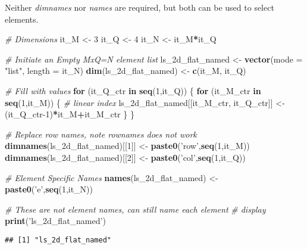 \documentclass[
]{book}
\newenvironment{Shaded}{\begin{snugshade}}{\end{snugshade}}
\newcommand{\CommentTok}[1]{\textcolor[rgb]{0.56,0.35,0.01}{\textit{#1}}}
\newcommand{\ControlFlowTok}[1]{\textcolor[rgb]{0.13,0.29,0.53}{\textbf{#1}}}
\newcommand{\DataTypeTok}[1]{\textcolor[rgb]{0.13,0.29,0.53}{#1}}
\newcommand{\DecValTok}[1]{\textcolor[rgb]{0.00,0.00,0.81}{#1}}
\newcommand{\KeywordTok}[1]{\textcolor[rgb]{0.13,0.29,0.53}{\textbf{#1}}}
\newcommand{\NormalTok}[1]{#1}
\newcommand{\OperatorTok}[1]{\textcolor[rgb]{0.81,0.36,0.00}{\textbf{#1}}}
\newcommand{\StringTok}[1]{\textcolor[rgb]{0.31,0.60,0.02}{#1}}
\begin{document}
Neither \emph{dimnames} nor \emph{names} are required, but both can be used to select elements.

\begin{Shaded}
\begin{Highlighting}[]
\CommentTok{# Dimensions}
\NormalTok{it_M <-}\StringTok{ }\DecValTok{3}
\NormalTok{it_Q <-}\StringTok{ }\DecValTok{4}
\NormalTok{it_N <-}\StringTok{ }\NormalTok{it_M}\OperatorTok{*}\NormalTok{it_Q}

\CommentTok{# Initiate an Empty MxQ=N element list}
\NormalTok{ls_2d_flat_named <-}\StringTok{ }\KeywordTok{vector}\NormalTok{(}\DataTypeTok{mode =} \StringTok{"list"}\NormalTok{, }\DataTypeTok{length =}\NormalTok{ it_N)}
\KeywordTok{dim}\NormalTok{(ls_2d_flat_named) <-}\StringTok{ }\KeywordTok{c}\NormalTok{(it_M, it_Q)}

\CommentTok{# Fill with values}
\ControlFlowTok{for}\NormalTok{ (it_Q_ctr }\ControlFlowTok{in} \KeywordTok{seq}\NormalTok{(}\DecValTok{1}\NormalTok{,it_Q)) \{}
  \ControlFlowTok{for}\NormalTok{ (it_M_ctr }\ControlFlowTok{in} \KeywordTok{seq}\NormalTok{(}\DecValTok{1}\NormalTok{,it_M)) \{}
    \CommentTok{# linear index}
\NormalTok{    ls_2d_flat_named[[it_M_ctr, it_Q_ctr]] <-}\StringTok{ }\NormalTok{(it_Q_ctr}\DecValTok{-1}\NormalTok{)}\OperatorTok{*}\NormalTok{it_M}\OperatorTok{+}\NormalTok{it_M_ctr}
\NormalTok{  \}}
\NormalTok{\}}

\CommentTok{# Replace row names, note rownames does not work}
\KeywordTok{dimnames}\NormalTok{(ls_2d_flat_named)[[}\DecValTok{1}\NormalTok{]] <-}\StringTok{ }\KeywordTok{paste0}\NormalTok{(}\StringTok{'row'}\NormalTok{,}\KeywordTok{seq}\NormalTok{(}\DecValTok{1}\NormalTok{,it_M))}
\KeywordTok{dimnames}\NormalTok{(ls_2d_flat_named)[[}\DecValTok{2}\NormalTok{]] <-}\StringTok{ }\KeywordTok{paste0}\NormalTok{(}\StringTok{'col'}\NormalTok{,}\KeywordTok{seq}\NormalTok{(}\DecValTok{1}\NormalTok{,it_Q))}

\CommentTok{# Element Specific Names}
\KeywordTok{names}\NormalTok{(ls_2d_flat_named) <-}\StringTok{ }\KeywordTok{paste0}\NormalTok{(}\StringTok{'e'}\NormalTok{,}\KeywordTok{seq}\NormalTok{(}\DecValTok{1}\NormalTok{,it_N))}

\CommentTok{# These are not element names, can still name each element}
\CommentTok{# display}
\KeywordTok{print}\NormalTok{(}\StringTok{'ls_2d_flat_named'}\NormalTok{)}
\end{Highlighting}
\end{Shaded}

\begin{verbatim}
## [1] "ls_2d_flat_named"
\end{verbatim}
\end{document}
